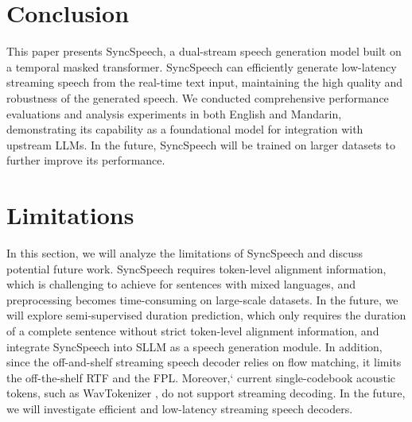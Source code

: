 
\section{Conclusion}
This paper presents SyncSpeech, a dual-stream speech generation model built on a temporal masked transformer. SyncSpeech can efficiently generate low-latency streaming speech from the real-time text input, maintaining the high quality and robustness of the generated speech. We conducted comprehensive performance evaluations and analysis experiments in both English and Mandarin, demonstrating its capability as a foundational model for integration with upstream LLMs. In the future, SyncSpeech will be trained on larger datasets to further improve its performance.
 

\section{Limitations}
In this section, we will analyze the limitations of
SyncSpeech and discuss potential future work. SyncSpeech requires token-level alignment information, which is challenging to achieve for sentences with mixed languages, and preprocessing becomes time-consuming on large-scale datasets. In the future, we will explore semi-supervised duration prediction, which only requires the duration of a complete sentence without strict token-level alignment information, and integrate SyncSpeech into SLLM as a speech generation module. In addition, since the off-and-shelf streaming speech decoder relies on flow matching, it limits the off-the-shelf RTF and the FPL. Moreover,` current single-codebook acoustic tokens, such as WavTokenizer \cite{wavtokenizer}, do not support streaming decoding. In the future, we will investigate efficient and low-latency streaming speech decoders.